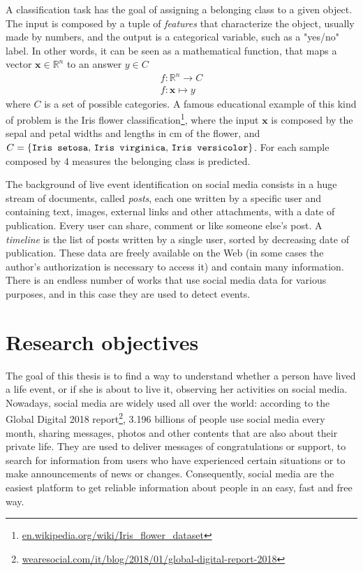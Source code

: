A classification task has the goal of assigning a belonging class to a given object. The input is composed by a tuple of \textit{features} that characterize the object, usually made by numbers, and the output is a categorical variable, such as a "yes/no" label. In other words, it can be seen as a mathematical function, that maps a vector $ \boldsymbol{x} \in \mathbb{R}^n $ to an answer $ y \in C $
\begin{gather*}
f \colon \mathbb{R}^n \to C \\
f \colon \boldsymbol{x} \mapsto y
\end{gather*}
where $C$ is a set of possible categories. A famous educational example of this kind of problem is the Iris flower classification\footnote{\url{en.wikipedia.org/wiki/Iris_flower_dataset}}, where the input $ \boldsymbol{x} $ is composed by the sepal and petal widths and lengths in cm of the flower, and $C = \{\text{\texttt{Iris setosa}, \texttt{Iris virginica}, \texttt{Iris versicolor}}\}$. For each sample composed by 4 measures the belonging class is predicted.

The background of live event identification on social media consists in a huge stream of documents, called \textit{posts}, each one written by a specific user and containing text, images, external links and other attachments, with a date of publication. Every user can share, comment or like someone else's post. A \textit{timeline} is the list of posts written by a single user, sorted by decreasing date of publication. These data are freely available on the Web (in some cases the author's authorization is necessary to access it) and contain many information. There is an endless number of works that use social media data for various purposes, and in this case they are used to detect events.

\section{Research objectives}

The goal of this thesis is to find a way to understand whether a person have lived a life event, or if she is about to live it, observing her activities on social media. Nowadays, social media are widely used all over the world: according to the Global Digital 2018 report\footnote{\url{wearesocial.com/it/blog/2018/01/global-digital-report-2018}}, 3.196 billions of people use social media every month, sharing messages, photos and other contents that are also about their private life. They are used to deliver messages of congratulations or support, to search for information from users who have experienced certain situations or to make announcements of news or changes. Consequently, social media are the easiest platform to get reliable information about people in an easy, fast and free way.

